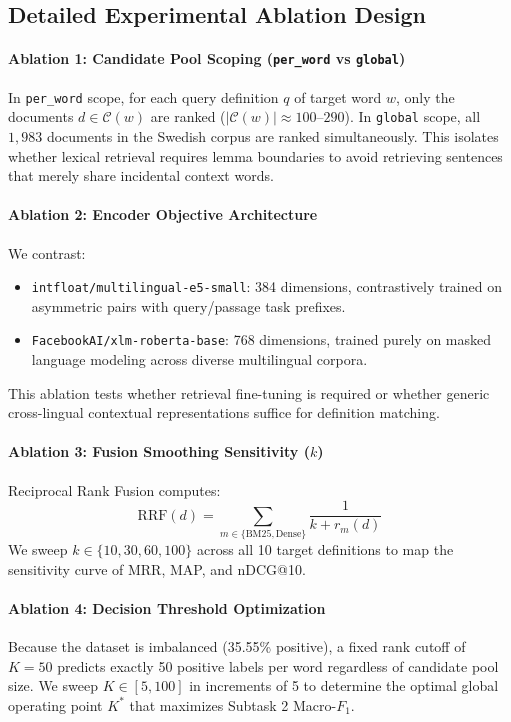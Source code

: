 \subsection{Detailed Experimental Ablation Design}

\paragraph{Ablation 1: Candidate Pool Scoping (\texttt{per\_word} vs \texttt{global})}
In \texttt{per\_word} scope, for each query definition $q$ of target word $w$, only the documents $d \in \mathcal{C}(w)$ are ranked ($|\mathcal{C}(w)| \approx 100\text{--}290$). In \texttt{global} scope, all $1,983$ documents in the Swedish corpus are ranked simultaneously. This isolates whether lexical retrieval requires lemma boundaries to avoid retrieving sentences that merely share incidental context words.

\paragraph{Ablation 2: Encoder Objective Architecture}
We contrast:
\begin{itemize}
    \item \texttt{intfloat/multilingual-e5-small}: 384 dimensions, contrastively trained on asymmetric pairs with query/passage task prefixes.
    \item \texttt{FacebookAI/xlm-roberta-base}: 768 dimensions, trained purely on masked language modeling across diverse multilingual corpora.
\end{itemize}
This ablation tests whether retrieval fine-tuning is required or whether generic cross-lingual contextual representations suffice for definition matching.

\paragraph{Ablation 3: Fusion Smoothing Sensitivity ($k$)}
Reciprocal Rank Fusion computes:
\begin{equation}
    \text{RRF}(d) = \sum_{m \in \{\text{BM25}, \text{Dense}\}} \frac{1}{k + r_m(d)}
\end{equation}
We sweep $k \in \{10, 30, 60, 100\}$ across all 10 target definitions to map the sensitivity curve of MRR, MAP, and nDCG@10.

\paragraph{Ablation 4: Decision Threshold Optimization}
Because the dataset is imbalanced (35.55\% positive), a fixed rank cutoff of $K=50$ predicts exactly 50 positive labels per word regardless of candidate pool size. We sweep $K \in [5, 100]$ in increments of 5 to determine the optimal global operating point $K^*$ that maximizes Subtask 2 Macro-$F_1$.

